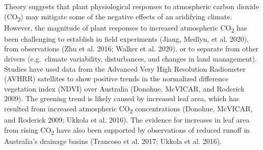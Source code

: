 \documentclass[
]{article}
\begin{document}
Theory suggests that plant physiological responses to atmospheric carbon
dioxide (CO\textsubscript{2}) may mitigate some of the negative effects
of an aridifying climate. However, the magnitude of plant responses to
increased atmospheric CO\textsubscript{2} has been challenging to
establish in field experiments (Jiang, Medlyn, et al. 2020), from
observations (Zhu et al. 2016; Walker et al. 2020), or to separate from
other drivers (e.g.~climate variability, disturbances, and changes in
land management). Studies have used data from the Advanced Very High
Resolution Radiometer (AVHRR) satellites to show positive trends in the
normalized difference vegetation index (NDVI) over Australia (Donohue,
McVICAR, and Roderick 2009). The greening trend is likely caused by
increased leaf area, which has resulted from increased atmospheric
CO\textsubscript{2} concentrations (Donohue, McVICAR, and Roderick 2009;
Ukkola et al. 2016). The evidence for increases in leaf area from rising
CO\textsubscript{2} have also been supported by observations of reduced
runoff in Australia's drainage basins (Trancoso et al. 2017; Ukkola et
al. 2016).
\end{document}
